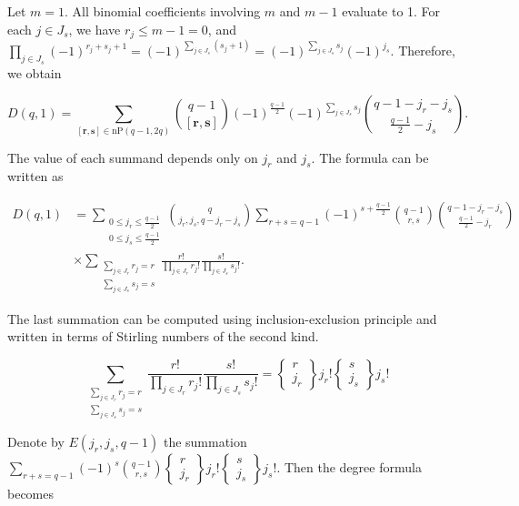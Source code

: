 \documentclass[11pt]{article}
\begin{document}
\begin{example}\label{Example:k2q1-deg}
    Let \(m = 1\). All binomial coefficients involving \(m\) and \(m-1\) evaluate to 1. For each \(j\in J_s\), we have \(r_j\leq m-1=0\), and \(\prod_{j\in J_s}(-1)^{r_j + s_j + 1} = (-1)^{\sum_{j\in J_s}(s_j + 1)} = (-1)^{\sum_{j\in J_s}s_j}(-1)^{j_s}\). Therefore, we obtain

    \[
    D(q, 1) = \sum_{[\mathbf{r}, \mathbf{s}]\in \mathrm{nP}(q-1, 2q)}\binom{q-1}{[\mathbf{r}, \mathbf{s}]} (-1)^{\frac{q-1}{2}}(-1)^{\sum_{j\in J_s}s_j}\binom{q-1-j_r-j_s}{\frac{q-1}{2}-j_s}.
    \]

    The value of each summand depends only on \(j_r\) and \(j_s\). The formula can be written as 

    \begin{align*}
        D(q, 1) &= \sum_{\substack{0\leq j_r\leq \frac{q-1}{2}\\0\leq j_s\leq \frac{q-1}{2}}}\binom{q}{j_r, j_s, q-j_r-j_s}\sum_{r + s = q-1}(-1)^{s + \frac{q-1}{2}}\binom{q-1}{r, s}\binom{q-1-j_r-j_s}{\frac{q-1}{2}-j_r}\\ 
        &\times\sum_{\substack{\sum_{j\in J_r}r_j=r\\ \sum_{j\in J_s}s_j=s}}\frac{r!}{\prod_{j\in J_r}r_j!}\frac{s!}{\prod_{j\in J_s}s_j!}.
    \end{align*}

    The last summation can be computed using inclusion-exclusion principle and written in terms of Stirling numbers of the second kind. 

    \[
    \sum_{\substack{\sum_{j\in J_r}r_j=r\\ \sum_{j\in J_s}s_j=s}}\frac{r!}{\prod_{j\in J_r}r_j!}\frac{s!}{\prod_{j\in J_s}s_j!} = \begin{Bmatrix}
        r\\j_r
    \end{Bmatrix}j_r!\begin{Bmatrix}
        s\\j_s
    \end{Bmatrix}j_s!
    \]

    Denote by \(E(j_r, j_s, q-1)\) the summation \(\sum_{r+s = q-1}(-1)^s\binom{q-1}{r, s}\begin{Bmatrix}
        r\\j_r
    \end{Bmatrix}j_r!\begin{Bmatrix}
        s\\j_s
    \end{Bmatrix}j_s!\). Then the degree formula becomes 


\end{example}
\end{document}
